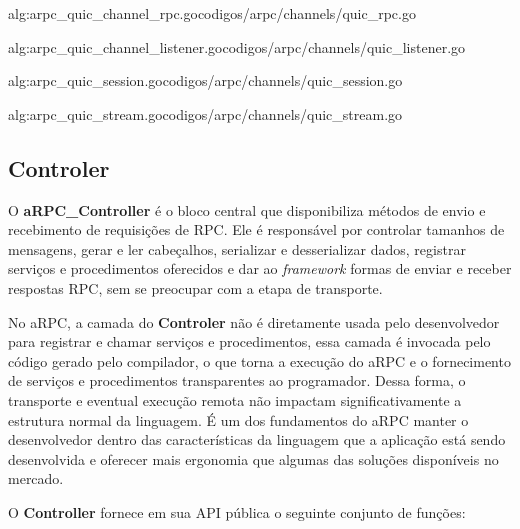  {alg:arpc_quic_channel_rpc.go}{codigos/arpc/channels/quic_rpc.go}{}

 {alg:arpc_quic_channel_listener.go}{codigos/arpc/channels/quic_listener.go}{}

 {alg:arpc_quic_session.go}{codigos/arpc/channels/quic_session.go}{}

 {alg:arpc_quic_stream.go}{codigos/arpc/channels/quic_stream.go}{}


\subsection{Controler}

O \textbf{aRPC\_Controller} é o bloco central que disponibiliza métodos de envio e recebimento de requisições de RPC. Ele é responsável por controlar tamanhos de mensagens, gerar e ler cabeçalhos, serializar e desserializar dados, registrar serviços e procedimentos oferecidos e dar ao \textit{framework} formas de enviar e receber respostas RPC, sem se preocupar com a etapa de transporte. 

No aRPC, a camada do \textbf{Controler} não é diretamente usada pelo desenvolvedor para registrar e chamar serviços e procedimentos, essa camada é invocada pelo código gerado pelo compilador, o que torna a execução do aRPC e o fornecimento de serviços e procedimentos transparentes ao programador. Dessa forma, o transporte e eventual execução remota não impactam significativamente a estrutura normal da linguagem. É um dos fundamentos do aRPC manter o desenvolvedor dentro das características da linguagem que a aplicação está sendo desenvolvida e oferecer mais ergonomia que algumas das soluções disponíveis no mercado.

O \textbf{Controller} fornece em sua API pública o seguinte conjunto de funções:


